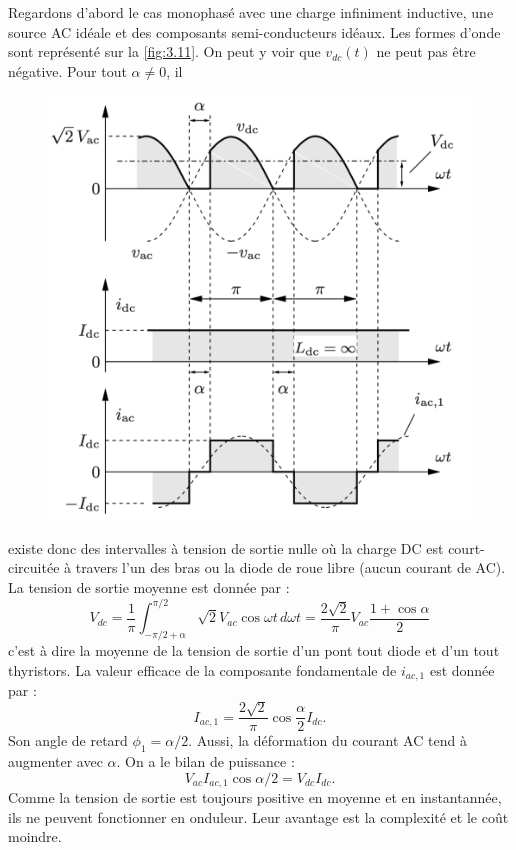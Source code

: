 		Regardons d'abord le cas monophasé avec une charge infiniment inductive, une source AC idéale et des composants semi-conducteurs idéaux. Les formes d'onde sont représenté sur la \autoref{fig:3.11}. On peut y voir que $v_{dc}(t)$ ne peut pas être négative. Pour tout $\alpha \neq 0$, il 
		
		\begin{figure}
		\vspace{-5mm}
		\includegraphics[scale=0.28]{ch3/11}
		\label{fig:3.11}
		\end{figure}
		existe donc des intervalles à tension de sortie nulle où la charge DC est court-circuitée à travers l'un des bras ou la diode de roue libre (aucun courant de AC). La tension de sortie moyenne est donnée par : 
		\begin{equation}
			V_{dc} = \frac{1}{\pi} \int _{-\pi /2 +\alpha} ^{\pi /2} \sqrt{2} V_{ac} \cos \omega t \, d\omega t = \frac{2\sqrt{2}}{\pi} V_{ac} \frac{1+\cos \alpha}{2}
		\end{equation}
		c'est à dire la moyenne de la tension de sortie d'un pont tout diode et d'un tout thyristors. La valeur efficace de la composante fondamentale de $i_{ac,1}$ est donnée par : 
		\begin{equation}
			I_{ac,1} = \frac{2\sqrt{2}}{\pi} \cos \frac{\alpha}{2} I_{dc}.
		\end{equation}
		Son angle de retard $\phi _1 = \alpha /2$. Aussi, la déformation du courant AC tend à augmenter avec $\alpha$. On a le bilan de puissance : 
		\begin{equation}
			V_{ac}I_{ac,1}\cos\alpha /2= V_{dc}I_{dc}. 
		\end{equation}
		Comme la tension de sortie est toujours positive en moyenne et en instantannée, ils ne peuvent fonctionner en onduleur. Leur avantage est la complexité et le coût moindre. \\
		
